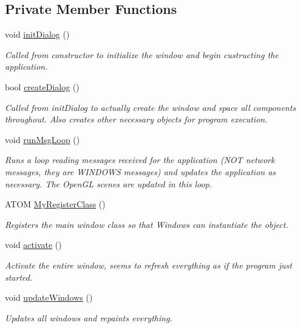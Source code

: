 \subsection*{Private Member Functions}
\begin{DoxyCompactItemize}
\item 
void \hyperlink{class_three_d_viewer_a118e422d82fbbb9080b8c325b970ca7a}{initDialog} ()
\begin{DoxyCompactList}\small\item\em Called from constructor to initialize the window and begin custructing the application. \end{DoxyCompactList}\item 
bool \hyperlink{class_three_d_viewer_a90fb8e2f5b72ba9d8caaadef00c97b66}{createDialog} ()
\begin{DoxyCompactList}\small\item\em Called from initDialog to actually create the window and space all components throughout. Also creates other necessary objects for program execution. \end{DoxyCompactList}\item 
void \hyperlink{class_three_d_viewer_aa100582896e1b771e6b25c9e0462f8fc}{runMsgLoop} ()
\begin{DoxyCompactList}\small\item\em Runs a loop reading messages received for the application (NOT network messages, they are WINDOWS messages) and updates the application as necessary. The OpenGL scenes are updated in this loop. \end{DoxyCompactList}\item 
ATOM \hyperlink{class_three_d_viewer_a6fc2bde69ead27c586347d873d011a63}{MyRegisterClass} ()
\begin{DoxyCompactList}\small\item\em Registers the main window class so that Windows can instantiate the object. \end{DoxyCompactList}\item 
void \hyperlink{class_three_d_viewer_a0b963795676d25baebc70627613351f5}{activate} ()
\begin{DoxyCompactList}\small\item\em Activate the entire window, seems to refresh everything as if the program just started. \end{DoxyCompactList}\item 
void \hyperlink{class_three_d_viewer_a82d4f55fa55abcb70afde12b8d410994}{updateWindows} ()
\begin{DoxyCompactList}\small\item\em Updates all windows and repaints everything. \end{DoxyCompactList}\item 

\end{DoxyCompactItemize}
